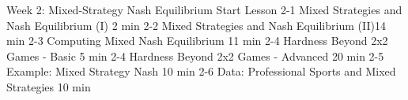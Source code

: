 
Week 2: Mixed-Strategy Nash Equilibrium
Start Lesson
2-1 Mixed Strategies and Nash Equilibrium (I) 2 min
2-2 Mixed Strategies and Nash Equilibrium (II)14 min
2-3 Computing Mixed Nash Equilibrium 11 min
2-4 Hardness Beyond 2x2 Games - Basic 5 min
2-4 Hardness Beyond 2x2 Games - Advanced 20 min
2-5 Example: Mixed Strategy Nash 10 min
2-6 Data: Professional Sports and Mixed Strategies 10 min
